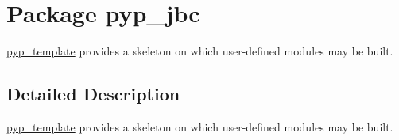 \hypertarget{namespacepyp__jbc}{
\section{Package pyp\_\-jbc}
\label{namespacepyp__jbc}
}


\hyperlink{namespacepyp__template}{pyp\_\-template} provides a skeleton on which user-\/defined modules may be built.  




\subsection{Detailed Description}
\hyperlink{namespacepyp__template}{pyp\_\-template} provides a skeleton on which user-\/defined modules may be built. 